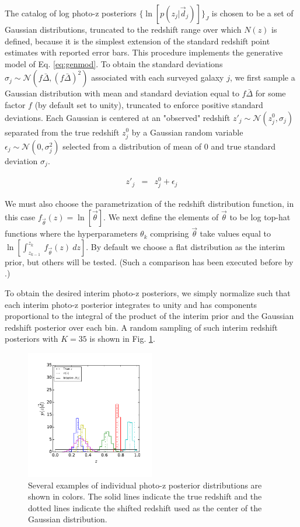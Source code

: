 \documentclass[preprint]{aastex}
\begin{document}
The catalog of log photo-z posteriors $\{\ln[p(z_{j}|\vec{d}_{j})]\}_{J}$ is 
chosen to be a set of Gaussian distributions, truncated to the redshift range 
over which $N(z)$ is defined, because it is the simplest extension of the 
standard redshift point estimates with reported error bars.  This procedure 
implements the generative model of Eq. \ref{eq:genmod}.  To obtain the standard 
deviations $\sigma_{j}\sim\mathcal{N}(f\bar{\Delta},(f\bar{\Delta})^{2})$ 
associated with each surveyed galaxy $j$, we first sample a Gaussian 
distribution with mean and standard deviation equal to $f\bar{\Delta}$ for some 
factor $f$ (by default set to unity), truncated to enforce positive standard 
deviations.  Each Gaussian is centered at an "observed" redshift 
$z'_{j}\sim\mathcal{N}(z^{0}_{j},\sigma_{j})$ separated from the true redshift 
$z^{0}_{j}$ by a Gaussian random variable 
$\epsilon_{j}\sim\mathcal{N}(0,\sigma^{2}_{j})$ selected from a distribution of 
mean of 0 and true standard deviation $\sigma_{j}$.  

\begin{eqnarray}
\label{eq:genmod}
z'_{j} &=& z^{0}_{j}+\epsilon_{j}
\end{eqnarray}

We must also choose the parametrization of the redshift distribution function, 
in this case $f_{\vec{\theta}}(z)=\ln[\vec{\theta}]$.  We next define the 
elements of $\vec{\theta}$ to be log top-hat functions where the 
hyperparameters $\theta_{k}$ comprising $\vec{\theta}$ take values equal to 
$\ln[\int_{z_{k-1}}^{z_{k}}\ f_{\vec{\theta}}(z)\ dz]$.  By default we choose a 
flat distribution as the interim prior, but others will be tested.  (Such a 
comparison has been executed before by \citet{Viironen2015}.)

To obtain the desired interim photo-z posteriors, we simply normalize such that 
each interim photo-z posterior integrates to unity and has components 
proportional to the integral of the product of the interim prior and the 
Gaussian redshift posterior over each bin.  A random sampling of such interim 
redshift posteriors with $K=35$ is shown in Fig. \ref{fig:nullpzs}.

\begin{figure}
\includegraphics[width=0.5\textwidth]{figs/null/samplepzs.pdf}
\caption{Several examples of individual photo-z posterior distributions are 
shown in colors.  The solid lines indicate the true redshift and the dotted 
lines indicate the shifted redshift used as the center of the Gaussian 
distribution.}
\label{fig:nullpzs}
\end{figure}
\end{document}
